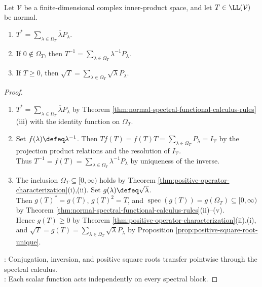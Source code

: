 \begin{corollary} \label{cor:spectral-functional-calculus-basic-functions} \\
Let $\mathcal{V}$ be a finite-dimensional complex inner-product space, and let $T\in\LL(\mathcal{V})$ be normal.
\begin{enumerate}[label=(\roman*)]
\setlength{\itemsep}{0pt}
\item $T^*=\sum\limits_{\lambda\in\Omega_T}\overline{\lambda}P_{\lambda}$.
\item If $0\notin\Omega_T$, then $T^{-1}=\sum\limits_{\lambda\in\Omega_T}\lambda^{-1}P_{\lambda}$.
\item If $T\geq0$, then $\sqrt{T}=\sum\limits_{\lambda\in\Omega_T}\sqrt{\lambda}P_{\lambda}$.
\end{enumerate}
\begin{proof}
\begin{enumerate}[label=(\roman*)]
\setlength{\itemsep}{0pt}
\item $T^*=\sum\limits_{\lambda\in\Omega_T}\overline{\lambda}P_{\lambda}$ by Theorem \ref{thm:normal-spectral-functional-calculus-rules}(iii) with the identity function on $\Omega_T$.
\item Set $f(\lambda)\defeq\lambda^{-1}$. Then $Tf(T)=f(T)T=\sum\limits_{\lambda\in\Omega_T}P_{\lambda}=I_{\mathcal{V}}$ by the projection product relations and the resolution of $I_{\mathcal{V}}$.\\
Thus $T^{-1}=f(T)=\sum\limits_{\lambda\in\Omega_T}\lambda^{-1}P_{\lambda}$ by uniqueness of the inverse.
\item The inclusion $\Omega_T\subseteq[0,\infty)$ holds by Theorem \ref{thm:positive-operator-characterization}(i),(ii). Set $g(\lambda)\defeq\sqrt{\lambda}$.\\
Then $g(T)^*=g(T)$, $g(T)^2=T$, and $\operatorname{spec}(g(T))=g(\Omega_T)\subseteq[0,\infty)$ by Theorem \ref{thm:normal-spectral-functional-calculus-rules}(ii)--(v).\\
Hence $g(T)\geq0$ by Theorem \ref{thm:positive-operator-characterization}(ii),(i), and $\sqrt{T}=g(T)=\sum\limits_{\lambda\in\Omega_T}\sqrt{\lambda}P_{\lambda}$ by Proposition \ref{prop:positive-square-root-unique}.
\end{enumerate}
: Conjugation, inversion, and positive square roots transfer pointwise through the spectral calculus.\\
: Each scalar function acts independently on every spectral block.
\end{proof}
\end{corollary}

